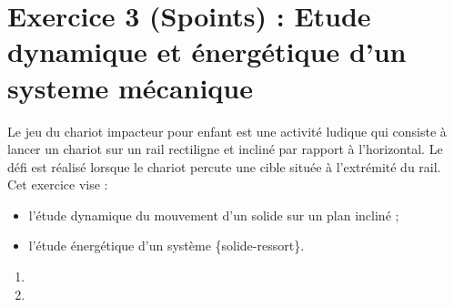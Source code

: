 \section*{Exercice 3 (Spoints) : Etude dynamique et énergétique d'un systeme mécanique}
Le jeu du chariot impacteur pour enfant est une activité ludique qui consiste à lancer un chariot sur un rail rectiligne et incliné par rapport à l'horizontal. Le défi est réalisé lorsque le chariot percute une cible située à l'extrémité du rail.\\
Cet exercice vise :

\begin{itemize}
  \item l'étude dynamique du mouvement d'un solide sur un plan incliné ;
  \item l'étude énergétique d'un système \{solide-ressort\}.
\end{itemize}

\begin{enumerate}
    \item 
    \item 
\end{enumerate}


